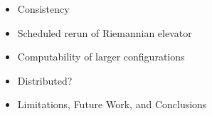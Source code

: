 \begin{itemize}
    \item Consistency
    \item Scheduled rerun of Riemannian elevator
    \item Computability of larger configurations
    \item Distributed? 
    \item Limitations, Future Work, and Conclusions
\end{itemize}